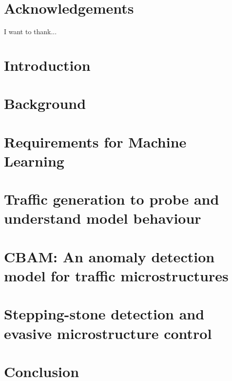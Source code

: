\documentclass[phd,ilcc,twoside]{infthesis}
\begin{document}
\chapter*{Acknowledgements}
I want to thank...

\tableofcontents

\chapter{Introduction}


\chapter{Background}


%


%
%

\chapter{Requirements for Machine Learning}\label{Chap:Req}


\chapter{Traffic generation to probe and understand model behaviour}\label{Chap:Prob}


\chapter{CBAM: An anomaly detection model for traffic microstructures}\label{Chap:CBAM}


\chapter{Stepping-stone detection and evasive microstructure control}\label{Chap:NSS}


\chapter{Conclusion}





\end{document}
